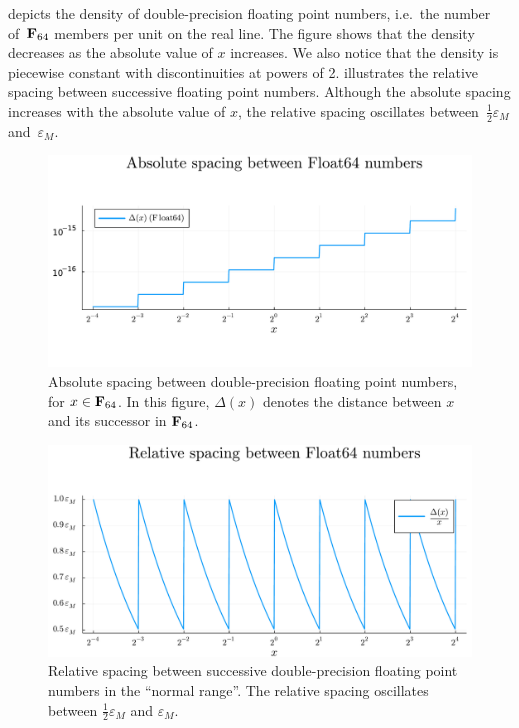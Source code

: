  depicts the density of double-precision floating point numbers,
i.e.\ the number of~$\mathbf F_{64}$ members per unit on the real line.
The figure shows that the density decreases as the absolute value of $x$ increases.
We also notice that the density is piecewise constant with discontinuities at powers of 2.
 illustrates the relative spacing between successive floating point numbers.
Although the absolute spacing increases with the absolute value of $x$,
the relative spacing oscillates between~$\frac{1}{2} \varepsilon_{M}$ and~$\varepsilon_M$.

\begin{figure}
    \centering
    \includegraphics[width=.8\textwidth]{figures/float64_density.pdf}
    \caption{%
        Absolute spacing between double-precision floating point numbers,
        for $x \in \mathbf F_{64}$.
        In this figure,
        $\Delta(x)$ denotes the distance between $x$ and its successor in $\mathbf F_{64}$.
    }%
    \label{fig:float64_density}%
\end{figure}

\begin{figure}[ht]
    \centering
    \includegraphics[width=.65\textwidth]{figures/float64_spacing.pdf}
    \caption{%
        Relative spacing between successive double-precision floating point numbers in the ``normal range''.
        The relative spacing oscillates between $\frac{1}{2} \varepsilon_M$ and $\varepsilon_M$.
    }%
    \label{fig:float64_spacing}
\end{figure}

